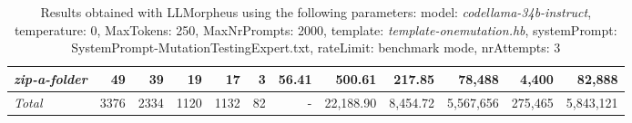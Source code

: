 \begin{table*}
{\begin{tabular}{l||r|r|r|r|r|r||r|r||r|r|r}
   \hline
   \textit{zip-a-folder} & 49 & 39 & 19 & 17 & 3 & 56.41 & 500.61 & 217.85 & 78,488 & 4,400 & 82,888 \\ 
   \hline
   \textit{Total} & 3376 & 2334 & 1120 & 1132 & 82 & - & 22,188.90  & 8,454.72 & 5,567,656 & 275,465 & 5,843,121 \\ 
 \end{tabular}
 }
 \caption{Results obtained with LLMorpheus using the following parameters: 
   model: \textit{codellama-34b-instruct}, 
   temperature: 0, 
   MaxTokens: 250, 
   MaxNrPrompts: 2000, 
   template: \textit{template-onemutation.hb}, 
   systemPrompt: SystemPrompt-MutationTestingExpert.txt, 
   rateLimit: benchmark mode, 
   nrAttempts: 3  
 }
\end{table*}

